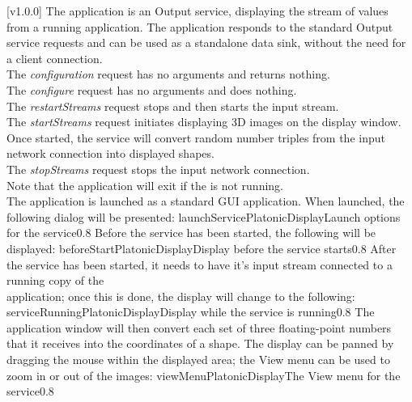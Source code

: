 [v1.0.0]
The  application is an Output service, displaying
the stream of values from a running  application.
The application responds to the standard Output service requests and can be used as a
standalone data sink, without the need for a client connection.\\

The \emph{configuration} request has no arguments and returns nothing.\\

The \emph{configure} request has no arguments and does nothing.\\

The \emph{restartStreams} request stops and then starts the input stream.\\

The \emph{startStreams} request initiates displaying 3D images on the display window.
Once started, the service will convert random number triples from the input \yarp{}
network connection into displayed shapes.\\

The \emph{stopStreams} request stops the input \yarp{} network connection.\\ 

Note that the application will exit if the \emph{\RS} is not running.\\

The  application is launched as a standard GUI
application.
When launched, the following dialog will be presented:
%
{launchServicePlatonicDisplay}{Launch options for the \emph{\PDO} service}{0.8}
\condPage{}
Before the service has been started, the following will be displayed:
%
{beforeStartPlatonicDisplay}{Display before the \emph{\PDO} service starts}{0.8}
\condPage{}
After the service has been started, it needs to have it's input stream connected to a
running copy of the\\
 application;
once this is done, the display will change to the following:
%
{serviceRunningPlatonicDisplay}{Display while the \emph{\PDO} service is running}{0.8}
\condPage{}
The  application window will then convert each
set of three floating-point numbers that it receives into the coordinates of a shape.
The display can be panned by dragging the mouse within the displayed area; the View menu
can be used to zoom in or out of the images:
%
{viewMenuPlatonicDisplay}{The View menu for the \emph{\PDO} service}{0.8}
\primaryEnd{}
